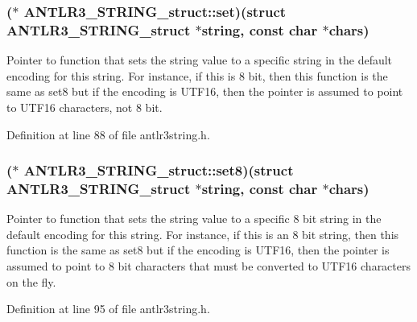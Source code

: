 \hypertarget{struct_a_n_t_l_r3___s_t_r_i_n_g__struct_a9e5e26394ed5b31e7df66e5330604912}{
\subsubsection[{set}]{($\ast$ A\-N\-T\-L\-R3\-\_\-\-S\-T\-R\-I\-N\-G\-\_\-struct\-::set)(struct {\bf A\-N\-T\-L\-R3\-\_\-\-S\-T\-R\-I\-N\-G\-\_\-struct} $\ast$string, const char $\ast${\bf chars})}}\label{struct_a_n_t_l_r3___s_t_r_i_n_g__struct_a9e5e26394ed5b31e7df66e5330604912}
Pointer to function that sets the string value to a specific string in the default encoding for this string. For instance, if this is 8 bit, then this function is the same as set8 but if the encoding is U\-T\-F16, then the pointer is assumed to point to U\-T\-F16 characters, not 8 bit. 

Definition at line 88 of file antlr3string.\-h.

\hypertarget{struct_a_n_t_l_r3___s_t_r_i_n_g__struct_a7c4603057e31e0e5d9988e8bfc29c654}{
\subsubsection[{set8}]{($\ast$ A\-N\-T\-L\-R3\-\_\-\-S\-T\-R\-I\-N\-G\-\_\-struct\-::set8)(struct {\bf A\-N\-T\-L\-R3\-\_\-\-S\-T\-R\-I\-N\-G\-\_\-struct} $\ast$string, const char $\ast${\bf chars})}}\label{struct_a_n_t_l_r3___s_t_r_i_n_g__struct_a7c4603057e31e0e5d9988e8bfc29c654}
Pointer to function that sets the string value to a specific 8 bit string in the default encoding for this string. For instance, if this is an 8 bit string, then this function is the same as set8 but if the encoding is U\-T\-F16, then the pointer is assumed to point to 8 bit characters that must be converted to U\-T\-F16 characters on the fly. 

Definition at line 95 of file antlr3string.\-h.

